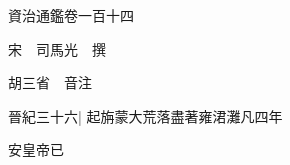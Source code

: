 






























































資治通鑑卷一百十四

宋　司馬光　撰

胡三省　音注

晉紀三十六|{
	起旃蒙大荒落盡著雍涒灘凡四年}


安皇帝已

